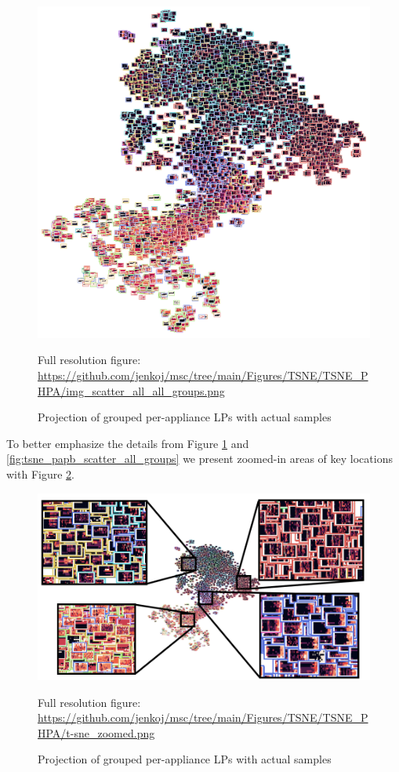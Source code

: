 \begin{figure}[H]  
	\centering
	\caption{Projection of grouped per-appliance LPs with actual samples}
	\includegraphics[width=.9\textwidth]{Figures/TSNE/TSNE_PHPA/img_scatter_all_all_groups.png}
	\label{fig:tsne_papb_img_scatter_all_groups}
	\par
	\par\footnotesize{Full resolution figure: \url{https://github.com/jenkoj/msc/tree/main/Figures/TSNE/TSNE_PHPA/img_scatter_all_all_groups.png}}
\end{figure}

To better emphasize the details from Figure \ref{fig:tsne_papb_img_scatter_all_groups} and \ref{fig:tsne_papb_scatter_all_groups} we present zoomed-in areas of key locations with Figure \ref{fig:t-sne_zoomed}.
\begin{figure}[H] 
	\centering
	\caption{Projection of grouped per-appliance LPs with actual samples}
	\includegraphics[width=.9\textwidth]{Figures/TSNE/TSNE_PHPA/t-sne_zoomed.png}
	\label{fig:t-sne_zoomed}
	\par
	\par\footnotesize{Full resolution figure: \url{https://github.com/jenkoj/msc/tree/main/Figures/TSNE/TSNE_PHPA/t-sne_zoomed.png}}
\end{figure}

